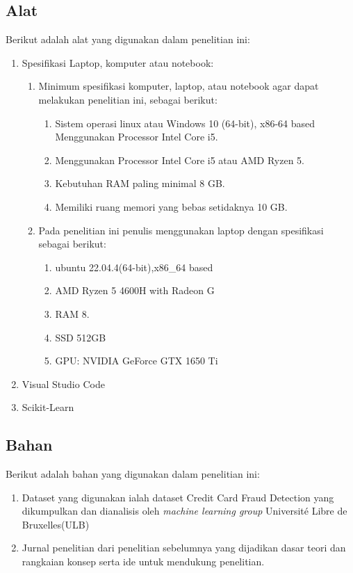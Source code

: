 \subsection{Alat}
Berikut adalah alat yang digunakan dalam penelitian ini:
\begin{enumerate}
    \item Spesifikasi Laptop, komputer atau notebook:
    \begin{enumerate}
        \item Minimum spesifikasi komputer, laptop, atau notebook agar dapat melakukan penelitian ini, sebagai berikut:
        \begin{enumerate}
            \item Sistem operasi linux atau  Windows 10 (64-bit), x86-64 based Menggunakan Processor Intel Core i5.
            \item Menggunakan Processor Intel Core i5 atau AMD Ryzen 5.
            \item Kebutuhan RAM paling minimal 8 GB.
            \item Memiliki ruang memori yang bebas setidaknya 10 GB.
        \end{enumerate}
        \item Pada penelitian ini penulis menggunakan laptop dengan spesifikasi sebagai berikut:
        \begin{enumerate}
            \item ubuntu 22.04.4(64-bit),x86\_64 based
            \item AMD Ryzen 5 4600H with Radeon G 
            \item RAM 8.
            \item SSD 512GB
            \item GPU: NVIDIA GeForce GTX 1650 Ti
        \end{enumerate}
    \end{enumerate}
    \item Visual Studio Code
    \item Scikit-Learn
\end{enumerate}
\subsection{Bahan}
Berikut adalah bahan yang digunakan dalam penelitian ini:
\begin{enumerate}
    \item Dataset yang digunakan ialah dataset Credit Card Fraud Detection yang dikumpulkan dan dianalisis oleh \textit{machine learning group} Université Libre de Bruxelles(ULB)
    \item Jurnal penelitian   dari penelitian sebelumnya yang dijadikan dasar teori dan rangkaian konsep serta ide untuk mendukung penelitian.
\end{enumerate}


